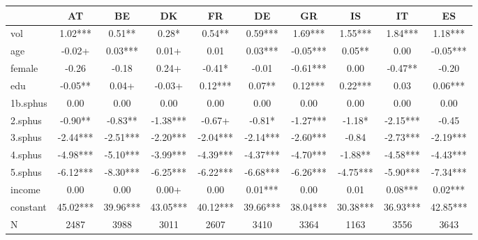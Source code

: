 {
\def\sym#1{\ifmmode^{#1}\else\(^{#1}\)\fi}
\begin{tabular}{l*{9}{c}}
\hline\hline
           
            &          AT   &           BE   &          DK   &           FR   &           DE   &          GR   &          IS  &           IT   &           ES   \\
            
\hline
vol         &        1.02***&        0.51** &        0.28*  &        0.54** &        0.59***&        1.69***&        1.55***&        1.84***&        1.18***\\
age         &       -0.02+  &        0.03***&        0.01+  &        0.01   &        0.03***&       -0.05***&        0.05** &        0.00   &       -0.05***\\
female      &       -0.26   &       -0.18   &        0.24+  &       -0.41*  &       -0.01   &       -0.61***&        0.00   &       -0.47** &       -0.20   \\
edu         &       -0.05** &        0.04+  &       -0.03+  &        0.12***&        0.07** &        0.12***&        0.22***&        0.03   &        0.06***\\
1b.sphus    &        0.00   &        0.00   &        0.00   &        0.00   &        0.00   &        0.00   &        0.00   &        0.00   &        0.00   \\
2.sphus     &       -0.90** &       -0.83** &       -1.38***&       -0.67+  &       -0.81*  &       -1.27***&       -1.18*  &       -2.15***&       -0.45   \\
3.sphus     &       -2.44***&       -2.51***&       -2.20***&       -2.04***&       -2.14***&       -2.60***&       -0.84   &       -2.73***&       -2.19***\\
4.sphus     &       -4.98***&       -5.10***&       -3.99***&       -4.39***&       -4.37***&       -4.70***&       -1.88** &       -4.58***&       -4.43***\\
5.sphus     &       -6.12***&       -8.30***&       -6.25***&       -6.22***&       -6.68***&       -6.26***&       -4.75***&       -5.90***&       -7.34***\\
income      &        0.00   &        0.00   &        0.00+  &        0.00   &        0.01***&        0.00   &        0.01   &        0.08***&        0.02***\\
constant    &       45.02***&       39.96***&       43.05***&       40.12***&       39.66***&       38.04***&       30.38***&       36.93***&       42.85***\\
\hline
N           &        2487   &        3988   &        3011   &        2607   &        3410   &        3364   &        1163   &        3556   &        3643   \\
\hline\hline
\end{tabular}
}
